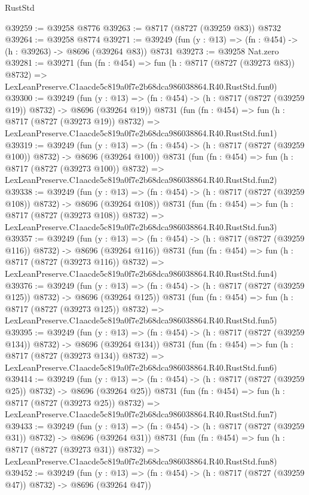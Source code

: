 \begin{lexlean}{RustStd}
\begin{coremodule}
@39259 := @39258 @8776
@39263 := @8717 (@8727 (@39259 @83)) @8732
@39264 := @39258 @8774
@39271 := @39249 (fun (y : @13) => (fn : @454) -> (h : @39263) -> @8696 (@39264 @83)) @8731
@39273 := @39258 Nat.zero
@39281 := @39271
    (fun (fn : @454) =>
    fun (h : @8717 (@8727 (@39273 @83)) @8732) =>
    LexLeanPreserve.C1aacde5c819a0f7e2b68dca986038864.R40.RustStd.fun0)
@39300 := @39249
    (fun (y : @13) => (fn : @454) -> (h : @8717 (@8727 (@39259 @19)) @8732) -> @8696 (@39264 @19))
    @8731
    (fun (fn : @454) =>
    fun (h : @8717 (@8727 (@39273 @19)) @8732) =>
    LexLeanPreserve.C1aacde5c819a0f7e2b68dca986038864.R40.RustStd.fun1)
@39319 := @39249
    (fun (y : @13) => (fn : @454) -> (h : @8717 (@8727 (@39259 @100)) @8732) -> @8696 (@39264 @100))
    @8731
    (fun (fn : @454) =>
    fun (h : @8717 (@8727 (@39273 @100)) @8732) =>
    LexLeanPreserve.C1aacde5c819a0f7e2b68dca986038864.R40.RustStd.fun2)
@39338 := @39249
    (fun (y : @13) => (fn : @454) -> (h : @8717 (@8727 (@39259 @108)) @8732) -> @8696 (@39264 @108))
    @8731
    (fun (fn : @454) =>
    fun (h : @8717 (@8727 (@39273 @108)) @8732) =>
    LexLeanPreserve.C1aacde5c819a0f7e2b68dca986038864.R40.RustStd.fun3)
@39357 := @39249
    (fun (y : @13) => (fn : @454) -> (h : @8717 (@8727 (@39259 @116)) @8732) -> @8696 (@39264 @116))
    @8731
    (fun (fn : @454) =>
    fun (h : @8717 (@8727 (@39273 @116)) @8732) =>
    LexLeanPreserve.C1aacde5c819a0f7e2b68dca986038864.R40.RustStd.fun4)
@39376 := @39249
    (fun (y : @13) => (fn : @454) -> (h : @8717 (@8727 (@39259 @125)) @8732) -> @8696 (@39264 @125))
    @8731
    (fun (fn : @454) =>
    fun (h : @8717 (@8727 (@39273 @125)) @8732) =>
    LexLeanPreserve.C1aacde5c819a0f7e2b68dca986038864.R40.RustStd.fun5)
@39395 := @39249
    (fun (y : @13) => (fn : @454) -> (h : @8717 (@8727 (@39259 @134)) @8732) -> @8696 (@39264 @134))
    @8731
    (fun (fn : @454) =>
    fun (h : @8717 (@8727 (@39273 @134)) @8732) =>
    LexLeanPreserve.C1aacde5c819a0f7e2b68dca986038864.R40.RustStd.fun6)
@39414 := @39249
    (fun (y : @13) => (fn : @454) -> (h : @8717 (@8727 (@39259 @25)) @8732) -> @8696 (@39264 @25))
    @8731
    (fun (fn : @454) =>
    fun (h : @8717 (@8727 (@39273 @25)) @8732) =>
    LexLeanPreserve.C1aacde5c819a0f7e2b68dca986038864.R40.RustStd.fun7)
@39433 := @39249
    (fun (y : @13) => (fn : @454) -> (h : @8717 (@8727 (@39259 @31)) @8732) -> @8696 (@39264 @31))
    @8731
    (fun (fn : @454) =>
    fun (h : @8717 (@8727 (@39273 @31)) @8732) =>
    LexLeanPreserve.C1aacde5c819a0f7e2b68dca986038864.R40.RustStd.fun8)
@39452 := @39249
    (fun (y : @13) => (fn : @454) -> (h : @8717 (@8727 (@39259 @47)) @8732) -> @8696 (@39264 @47))

\end{coremodule}
\end{lexlean}
